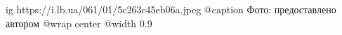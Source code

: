  
 
 
 
 

\ifcmt
  ig https://i.lb.ua/061/01/5c263c45eb06a.jpeg
	@caption Фото: предоставлено автором
  @wrap center
  @width 0.9
\fi
